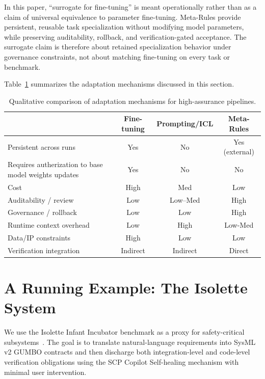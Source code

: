 \documentclass[conference]{IEEEtran}
\begin{document}
In this paper, ``surrogate for fine-tuning'' is meant operationally rather than as a claim of universal equivalence to parameter fine-tuning. Meta-Rules provide persistent, reusable task specialization without modifying model parameters, while preserving auditability, rollback, and verification-gated acceptance. The surrogate claim is therefore about retained specialization behavior under governance constraints, not about matching fine-tuning on every task or benchmark.

Table~\ref{tab:adaptation-compare} summarizes the adaptation mechanisms discussed in this section.

\begin{table}[!b]
\centering
\caption{Qualitative comparison of adaptation mechanisms for high-assurance pipelines.}
\label{tab:adaptation-compare}
\small
\begin{tabular}{lccc}
\hline
 & Fine-tuning & Prompting/ICL & Meta-Rules \\
\hline
Persistent across runs & Yes & No & Yes (external) \\
Requires autherization to base model weights updates & Yes & No & No \\
Cost & High & Med & Low \\
Auditability / review & Low & Low--Med & High \\
Governance / rollback & Low & Low & High \\
Runtime context overhead & Low & High & Low-Med \\
Data/IP constraints & High & Low & Low \\
Verification integration & Indirect & Indirect & Direct \\
\hline
\end{tabular}
\end{table}

\section{A Running Example: The Isolette System}
\label{sec:example}

We use the Isolette Infant Incubator benchmark as a proxy for safety-critical subsystems~\cite{hatcliff2024isolette}. The goal is to translate natural-language requirements into SysML v2 GUMBO contracts and then discharge both integration-level and code-level verification obligations using the SCP Copilot Self-healing mechanism with minimal user intervention.
\end{document}
